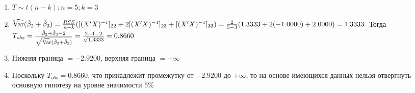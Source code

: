 \documentclass[pdftex,11pt,openany]{book}\usepackage[]{graphicx}\usepackage[]{color}
\begin{document}
\begin{solution}
\begin{enumerate}
\begin{enumerate}
\item $T \sim t(n-k); n = 5; k = 3$
\item $\widehat{\operatorname{Var}}(\hat{\beta}_2 + \hat{\beta}_3) = \frac{RSS}{n - k}([(X'X)^{-1}]_{22} + 2[(X'X)^{-1}]_{23} + [(X'X)^{-1}]_{33}) = \frac{2}{5 - 3} (1.3333 + 2(-1.0000) + 2.0000) = 1.3333.$ Тогда $T_{obs} = \frac{\hat{\beta}_2 + \hat{\beta}_3 - 2}{\sqrt{\widehat{\operatorname{Var}}(\hat{\beta}_2 + \hat{\beta}_3)}} = \frac{2 + 1 - 2}{\sqrt{1.3333}} = 0.8660$
\item Нижняя граница $= - 2.9200$, верхняя граница $= + \infty$
\item Поскольку $T_{obs} = 0.8660$, что принадлежит промежутку от $-  2.9200$ до $+ \infty$, то на основе имеющихся данных нельзя отвергнуть основную гипотезу на уровне значимости $5\%$
\end{enumerate}
\end{enumerate}
\end{solution}
\end{document}
